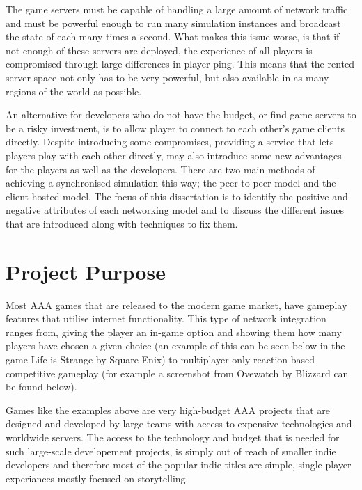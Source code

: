 The game servers must be capable of handling a large amount of network traffic and must be powerful enough to run many simulation instances and broadcast the state of each many times a second. What makes this issue worse, is that if not enough of these servers are deployed, the experience of all players is compromised through large differences in player ping. This means that the rented server space not only has to be very powerful, but also available in as many regions of the world as possible.

An alternative for developers who do not have the budget, or find game servers to be a risky investment, is to allow player to connect to each other's game clients directly. Despite introducing some compromises, providing a service that lets players play with each other directly, may also introduce some new advantages for the players as well as the developers. There are two main methods of achieving a synchronised simulation this way; the peer to peer model and the client hosted model. The focus of this dissertation is to identify the positive and negative attributes of each networking model and to discuss the different issues that are introduced along with techniques to fix them.


\section{Project Purpose}
Most AAA games that are released to the modern game market, have gameplay features that utilise internet functionality. This type of network integration ranges from, giving the player an in-game option and showing them how many players have chosen a given choice (an example of this can be seen below in the game Life is Strange by Square Enix) to multiplayer-only reaction-based competitive gameplay (for example a screenshot from Ovewatch by Blizzard can be found below).
\begin{figure}[!h]
  \centering
{}
  \qquad
\end{figure}

Games like the examples above are very high-budget AAA projects that are designed and developed by large teams with access to expensive technologies and worldwide servers. The access to the technology and budget that is needed for such large-scale developement projects, is simply out of reach of smaller indie developers and therefore most of the popular indie titles are simple, single-player experiances mostly focused on storytelling.

